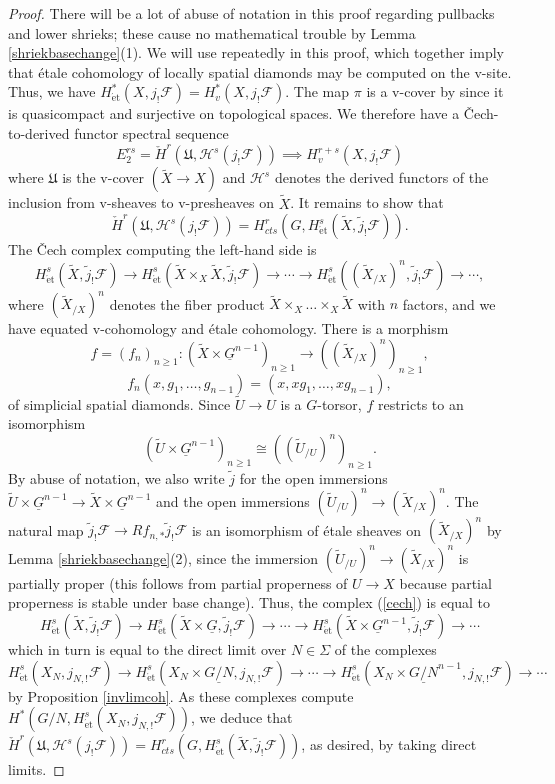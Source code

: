 \documentclass{amsart}
\theoremstyle{remark}
\numberwithin{equation}{subsection}
\newcommand{\cF}{{\mathcal F}}
\newcommand{\cH}{{\mathcal H}}
\newcommand{\et}{\mathrm{\acute{e}t}}
\newcommand{\ul}{\underline}
\newcommand{\wt}{\widetilde}
\newcommand{\mf}{\mathfrak}
\renewcommand{\(}{\left(}
\renewcommand{\)}{\right)}
\begin{document}
\begin{proof}
There will be a lot of abuse of notation in this proof regarding pullbacks and lower shrieks; these cause no mathematical trouble by Lemma \ref{shriekbasechange}(1). We will use \cite[Propositions 14.7, 14.8]{diamonds} repeatedly in this proof, which together imply that \'etale cohomology of locally spatial diamonds may be computed on the v-site. Thus, we have $H_{\et}^{\ast}(X,j_{!}\cF)=H_{v}^{\ast}(X,j_{!}\cF)$. The map $\pi$ is a v-cover by \cite[Lemma 12.11]{diamonds} since it is quasicompact and surjective on topological spaces. We therefore have a \v{C}ech-to-derived functor spectral sequence
$$ E_{2}^{rs}=\check{H}^{r}(\mf{U},\cH^{s}(j_{!}\cF)) \implies H^{r+s}_{v}(X,j_{!}\cF) $$
where $\mf{U}$ is the v-cover $(\wt{X} \to X)$ and $\cH^{s}$ denotes the derived functors of the inclusion from v-sheaves to v-presheaves on $\wt{X}$. It remains to show that
$$ \check{H}^{r}(\mf{U},\cH^{s}(j_{!}\cF))=H^{r}_{cts}(G,H_{\et}^{s}(\wt{X},\wt{j}_{!}\cF)). $$
The \v{C}ech complex computing the left-hand side is
\[ H_{\et}^{s}(\wt{X},\wt{j}_{!}\cF) \to H_{\et}^{s}(\wt{X}\times_{X}\wt{X},\wt{j}_{!}\cF) \to \dotsb \to H_{\et}^{s}((\wt{X}_{/X})^{n},\wt{j}_{!}\cF) \to \dotsb, \label{cech} \tag{$\ast$} \]
where $(\wt{X}_{/X})^{n}$ denotes the fiber product $\wt{X} \times_{X} \dots \times_{X}\wt{X}$ with $n$ factors, and we have equated v-cohomology and \'etale cohomology. There is a morphism
$$ f=(f_{n})_{n\geq 1} \colon (\wt{X}\times \ul{G}^{n-1})_{n\geq 1} \to ((\wt{X}_{/X})^{n})_{n\geq 1}, $$
$$ f_{n}(x,g_{1},\dots,g_{n-1})=(x,xg_{1},\dots,xg_{n-1}), $$
of simplicial spatial diamonds. Since $\wt{U} \to U$ is a $G$-torsor, $f$ restricts to an isomorphism 
$$ (\wt{U}\times \ul{G}^{n-1})_{n\geq 1} \cong ((\wt{U}_{/U})^{n})_{n\geq 1}. $$ 
By abuse of notation, we also write $\wt{j}$ for the open immersions $\wt{U}\times\ul{G}^{n-1} \to \wt{X} \times \ul{G}^{n-1}$ and the open immersions $(\wt{U}_{/U})^{n} \to (\wt{X}_{/X})^{n}$. The natural map $\wt{j}_{!}\cF \to Rf_{n,\ast}\wt{j}_{!}\cF$ is an isomorphism of \'etale sheaves on $(\wt{X}_{/X})^{n}$ by Lemma \ref{shriekbasechange}(2), since the immersion $(\wt{U}_{/U})^{n} \to (\wt{X}_{/X})^{n}$ is partially proper (this follows from partial properness of $U \to X$ because partial properness is stable under base change). Thus, the complex (\ref{cech}) is equal to
$$ H_{\et}^{s}(\wt{X},\wt{j}_{!}\cF) \to H_{\et}^{s}(\wt{X}\times \ul{G},\wt{j}_{!}\cF) \to \dotsb \to H_{\et}^{s}(\wt{X}\times \ul{G}^{n-1},\wt{j}_{!}\cF) \to \dotsb $$
which in turn is equal to the direct limit over $N\in \Sigma$ of the complexes
$$ H_{\et}^{s}(X_{N},j_{N,!}\cF) \to H_{\et}^{s}(X_{N}\times \ul{G/N},j_{N,!}\cF) \to \dotsb \to H_{\et}^{s}(X_{N}\times \ul{G/N}^{n-1},j_{N,!}\cF) \to \dotsb $$
by Proposition \ref{invlimcoh}. As these complexes compute $H^{\ast}(G/N, H^{s}_{\et}(X_{N},j_{N,!}\cF))$, we deduce that $\check{H}^{r}(\mf{U},\cH^{s}(j_{!}\cF))=H^{r}_{cts}(G,H_{\et}^{s}(\wt{X},\wt{j}_{!}\cF))$, as desired, by taking direct limits.
\end{proof}
\end{document}
